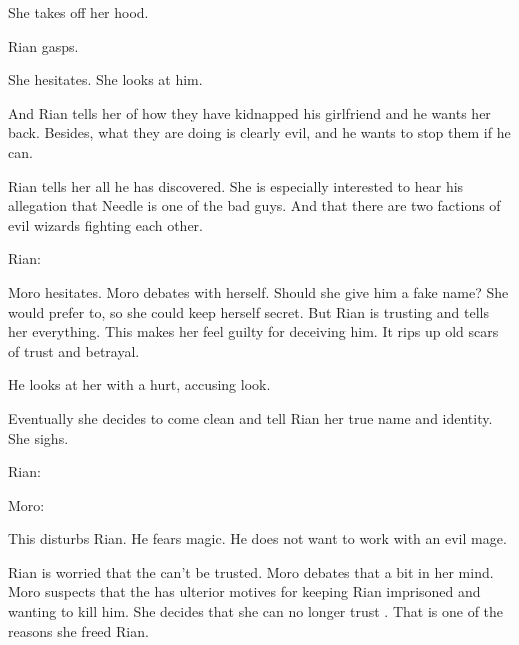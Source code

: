She takes off her hood. 

Rian gasps.



She hesitates. 
She looks at him.



And Rian tells her of how they have kidnapped his girlfriend and he wants her back.
Besides, what they are doing is clearly evil, and he wants to stop them if he can. 


Rian tells her all he has discovered. 
She is especially interested to hear his allegation that Needle is one of the bad guys. 
And that there are two factions of evil wizards fighting each other. 

Rian:

Moro hesitates. 
Moro debates with herself. 
Should she give him a fake name? 
She would prefer to, so she could keep herself secret. 
But Rian is trusting and tells her everything. 
This makes her feel guilty for deceiving him. 
It rips up old scars of trust and betrayal. 

He looks at her with a hurt, accusing look.

Eventually she decides to come clean and tell Rian her true name and identity. 
She sighs.

Rian:

Moro:

This disturbs Rian. 
He fears magic. 
He does not want to work with an evil mage.

Rian is worried that the \rinyuth can't be trusted. 
Moro debates that a bit in her mind.
Moro suspects that the \rinyuth has ulterior motives for keeping Rian imprisoned and wanting to kill him. 
She decides that she can no longer trust \Tiroco.
That is one of the reasons she freed Rian. 

